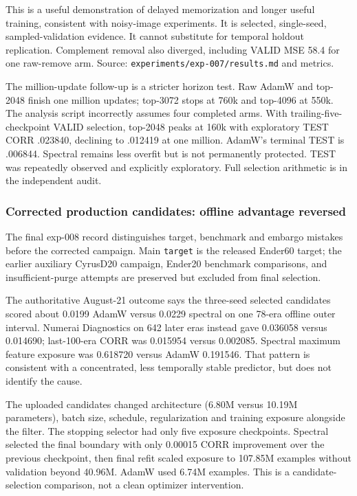 \documentclass[
  british,
  10pt,
  a4paper,
]{article}
\begin{document}
This is a useful demonstration of delayed memorization and longer useful
training, consistent with noisy-\allowbreak{}image
experiments.\allowbreak{} It is selected,
single-\allowbreak{}seed,\allowbreak{} sampled-\allowbreak{}validation
evidence. It cannot substitute for temporal holdout
replication.\allowbreak{} Complement removal also diverged, including
VALID MSE 58.4 for one raw-remove arm. Source:
\texttt{experiments/\allowbreak{}exp-\allowbreak{}007/\allowbreak{}results.\allowbreak{}md}
and metrics.

The million-\allowbreak{}update follow-up is a stricter horizon test.
Raw AdamW and top-2048 finish one million updates; top-3072 stops at
760k and top-4096 at 550k. The analysis script incorrectly assumes four
completed arms. With trailing-\allowbreak{}five-\allowbreak{}checkpoint
VALID selection, top-2048 peaks at 160k with exploratory TEST CORR
.023840, declining to .012419 at one million. AdamW's terminal TEST is
.006844. Spectral remains less overfit but is not permanently protected.
TEST was repeatedly observed and explicitly exploratory.\allowbreak{}
Full selection arithmetic is in the independent audit.

\subsubsection{Corrected production candidates: offline advantage
reversed}\label{external-studies--corrected-production-candidates-offline-advantage-reversed}

The final exp-008 record distinguishes target, benchmark and embargo
mistakes before the corrected campaign. Main \texttt{target} is the
released Ender60 target; the earlier auxiliary CyrusD20 campaign,
Ender20 benchmark comparisons,\allowbreak{} and
insufficient\allowbreak{}-\allowbreak{}purge attempts are preserved but
excluded from final selection.

The authoritative August-21 outcome says the three-seed selected
candidates scored about 0.0199 AdamW versus 0.0229 spectral on one
78-era offline outer interval. Numerai Diagnostics on 642 later eras
instead gave 0.036058 versus 0.014690;
last-\allowbreak{}100-\allowbreak{}era CORR was 0.015954 versus
0.002085. Spectral maximum feature exposure was 0.618720 versus AdamW
0.191546. That pattern is consistent with a
concentrated\allowbreak{},\allowbreak{} less temporally stable
predictor, but does not identify the cause.

The uploaded candidates changed architecture (6.80M versus 10.19M
parameters),\allowbreak{} batch size, schedule, regularization and
training exposure alongside the filter. The stopping selector had only
five exposure checkpoints.\allowbreak{} Spectral selected the final
boundary with only 0.00015 CORR improvement over the previous
checkpoint,\allowbreak{} then final refit scaled exposure to 107.85M
examples without validation beyond 40.96M. AdamW used 6.74M examples.
This is a candidate-\allowbreak{}selection comparison,\allowbreak{} not
a clean optimizer intervention\allowbreak{}.\allowbreak{}
\end{document}
